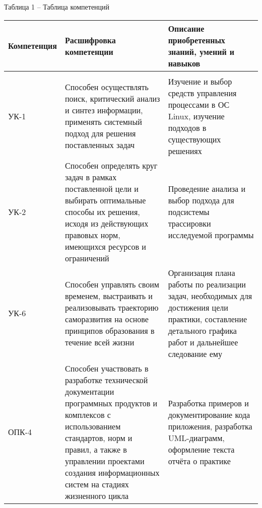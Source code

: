 \vspace{12pt}
\noindent Таблица 1 -- Таблица компетенций
\vspace{-5pt}
{
	\fontsize{13}{9}\selectfont
	\noindent \begin{longtable}[c]{|p{2.6cm}|p{6.2cm}|p{6cm}|}
		\hline
		Компетенция & Расшифровка компетенции & Описание приобретенных знаний, умений и навыков \\
		
		\endfirsthead
		\caption*{\raggedright Продолжение таблицы 1\vspace*{-35pt}}\\
		\endhead
		
		\hline
		УК-1 &
		Способен осуществлять поиск, критический анализ и синтез информации, применять системный подход для решения поставленных задач &
		Изучение и выбор средств управления процессами в ОС Linux, изучение подходов в существующих решениях
		\\ \hline
		
		УК-2 &
		Способен определять круг задач в рамках поставленной цели и выбирать оптимальные способы их решения, исходя из действующих правовых норм, имеющихся ресурсов и ограничений &
		Проведение анализа и выбор подхода для подсистемы трассировки исследуемой программы
		\\ \hline
		
		УК-6 & 
		Способен управлять своим временем, выстраивать и реализовывать траекторию саморазвития на основе принципов образования в течение всей жизни & 
		Организация плана работы по реализации задач, необходимых для достижения цели практики, составление детального графика работ и дальнейшее следование ему
		\\ \hline
		
		ОПК-4 & 
		Способен участвовать в разработке технической документации программных продуктов и комплексов с использованием стандартов, норм и правил, а также в управлении проектами создания информационных систем на стадиях жизненного цикла & 
		Разработка примеров и документирование кода приложения, разработка UML-диаграмм, оформление текста отчёта о практике
		\\ \hline
		
	\end{longtable}
}
